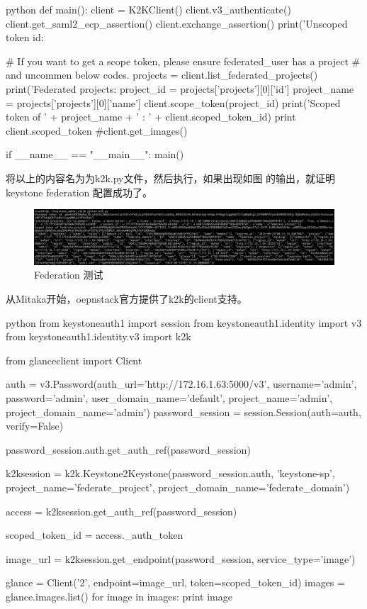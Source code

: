 \begin{code-block}{python}
def main():
    client = K2KClient()
    client.v3_authenticate()
    client.get_saml2_ecp_assertion()
    client.exchange_assertion()
    print('Unscoped token id: %

    # If you want to get a scope token, please ensure federated_user has a project
    # and uncommen below codes.
    projects = client.list_federated_projects()
    print('Federated projects: %
    project_id = projects['projects'][0]['id']
    project_name = projects['projects'][0]['name']
    client.scope_token(project_id)
    print('Scoped token of ' + project_name + ' : ' + client.scoped_token_id)
    print client.scoped_token
    #client.get_images()


if __name__ == "__main__":
    main()
\end{code-block}
将以上的内容名为为k2k.py文件，然后执行，如果出现如图 的输出，就证明keystone federation
配置成功了。
\begin{figure}[H]
  \centering
  \includegraphics[scale=0.20]{k2k_result.png}
  \caption{Federation 测试}
  \label{fig:k2k_result}
\end{figure}

从Mitaka开始，oepnstack官方提供了k2k的client支持。
\begin{code-block}{python}
from keystoneauth1 import session
from keystoneauth1.identity import v3
from keystoneauth1.identity.v3 import k2k

from glanceclient import Client

auth = v3.Password(auth_url='http://172.16.1.63:5000/v3',
                   username='admin',
                   password='admin',
                   user_domain_name='default',
                   project_name='admin',
                   project_domain_name='admin')
password_session = session.Session(auth=auth, verify=False)

password_session.auth.get_auth_ref(password_session)

k2ksession = k2k.Keystone2Keystone(password_session.auth,
    'keystone-sp', project_name='federate_project',
    project_domain_name='federate_domain')

access = k2ksession.get_auth_ref(password_session)

scoped_token_id = access._auth_token

image_url = k2ksession.get_endpoint(password_session,
                                    service_type='image')

glance = Client('2', endpoint=image_url, token=scoped_token_id)
images = glance.images.list()
for image in images:
    print image
\end{code-block}

